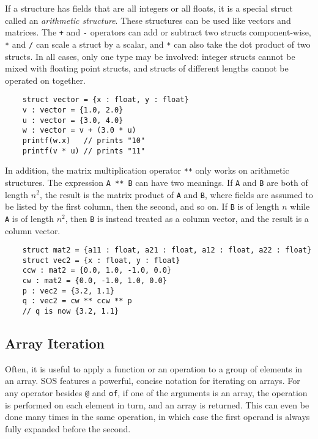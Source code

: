 \documentclass[main.tex]{subfiles}
\begin{document}
	If a structure has fields that are all integers or all floats, it is a special struct called an \textit{arithmetic structure}. These structures can be used like vectors and matrices. The \texttt{+} and \texttt{-} operators can add or subtract two structs component-wise, \texttt{*} and \texttt{/} can scale a struct by a scalar, and \texttt{*} can also take the dot product of two structs. In all cases, only one type may be involved: integer structs cannot be mixed with floating point structs, and structs of different lengths cannot be operated on together.
	
	\begin{lstlisting}
	struct vector = {x : float, y : float}
	v : vector = {1.0, 2.0}
	u : vector = {3.0, 4.0}
	w : vector = v + (3.0 * u)
	printf(w.x)   // prints "10"
	printf(v * u) // prints "11" \end{lstlisting}
	
	In addition, the matrix multiplication operator \texttt{**} only works on arithmetic structures. The expression \texttt{A ** B} can have two meanings. If \texttt{A} and \texttt{B} are both of length $n^2$, the result is the matrix product of \texttt{A} and \texttt{B}, where fields are assumed to be listed by the first column, then the second, and so on. If \texttt{B} is of length $n$ while \texttt{A} is of length $n^2$, then \texttt{B} is instead treated as a column vector, and the result is a column vector.
	
	\begin{lstlisting}
	struct mat2 = {a11 : float, a21 : float, a12 : float, a22 : float}
	struct vec2 = {x : float, y : float}
	ccw : mat2 = {0.0, 1.0, -1.0, 0.0}
	cw : mat2 = {0.0, -1.0, 1.0, 0.0}
	p : vec2 = {3.2, 1.1}
	q : vec2 = cw ** ccw ** p
	// q is now {3.2, 1.1} \end{lstlisting}
	
	\subsection{Array Iteration}
	Often, it is useful to apply a function or an operation to a group of elements in an array. SOS features a powerful, concise notation for iterating on arrays. For any operator besides \texttt{@} and \texttt{of}, if one of the arguments is an array, the operation is performed on each element in turn, and an array is returned. This can even be done many times in the same operation, in which case the first operand is always fully expanded before the second.
	
\end{document}
